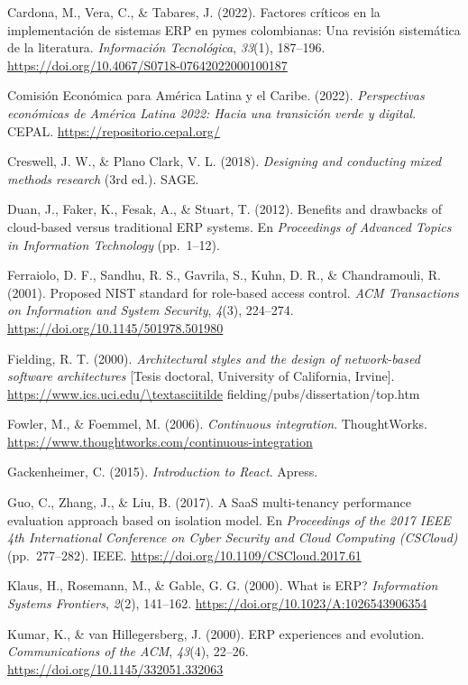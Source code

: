Cardona, M., Vera, C., \& Tabares, J. (2022). Factores críticos en la implementación de sistemas ERP
en pymes colombianas: Una revisión sistemática de la literatura. \emph{Información Tecnológica},
\emph{33}(1), 187--196. \url{https://doi.org/10.4067/S0718-07642022000100187}

Comisión Económica para América Latina y el Caribe. (2022). \emph{Perspectivas económicas de América
Latina 2022: Hacia una transición verde y digital}. CEPAL.
\url{https://repositorio.cepal.org/}

Creswell, J. W., \& Plano Clark, V. L. (2018). \emph{Designing and conducting mixed methods research}
(3rd ed.). SAGE.

Duan, J., Faker, K., Fesak, A., \& Stuart, T. (2012). Benefits and drawbacks of cloud-based versus
traditional ERP systems. En \emph{Proceedings of Advanced Topics in Information Technology}
(pp.~1--12).

Ferraiolo, D. F., Sandhu, R. S., Gavrila, S., Kuhn, D. R., \& Chandramouli, R. (2001). Proposed NIST
standard for role-based access control. \emph{ACM Transactions on Information and System Security},
\emph{4}(3), 224--274. \url{https://doi.org/10.1145/501978.501980}

Fielding, R. T. (2000). \emph{Architectural styles and the design of network-based software architectures}
{[}Tesis doctoral, University of California, Irvine{]}.
\url{https://www.ics.uci.edu/\textasciitilde} fielding/pubs/dissertation/top.htm

Fowler, M., \& Foemmel, M. (2006). \emph{Continuous integration}. ThoughtWorks.
\url{https://www.thoughtworks.com/continuous-integration}

Gackenheimer, C. (2015). \emph{Introduction to React}. Apress.

Guo, C., Zhang, J., \& Liu, B. (2017). A SaaS multi-tenancy performance evaluation approach based on
isolation model. En \emph{Proceedings of the 2017 IEEE 4th International Conference on Cyber Security
and Cloud Computing (CSCloud)} (pp.~277--282). IEEE.
\url{https://doi.org/10.1109/CSCloud.2017.61}

Klaus, H., Rosemann, M., \& Gable, G. G. (2000). What is ERP? \emph{Information Systems Frontiers},
\emph{2}(2), 141--162. \url{https://doi.org/10.1023/A:1026543906354}

Kumar, K., \& van Hillegersberg, J. (2000). ERP experiences and evolution. \emph{Communications of the
ACM}, \emph{43}(4), 22--26. \url{https://doi.org/10.1145/332051.332063}

